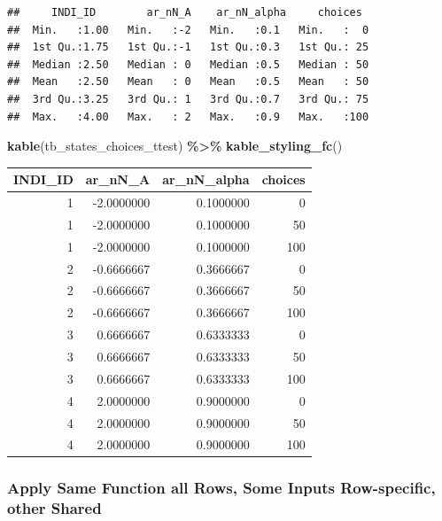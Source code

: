 \documentclass[
]{book}
\newenvironment{Shaded}{\begin{snugshade}}{\end{snugshade}}
\newcommand{\KeywordTok}[1]{\textcolor[rgb]{0.13,0.29,0.53}{\textbf{#1}}}
\newcommand{\NormalTok}[1]{#1}
\newcommand{\OperatorTok}[1]{\textcolor[rgb]{0.81,0.36,0.00}{\textbf{#1}}}
\newcommand{\StringTok}[1]{\textcolor[rgb]{0.31,0.60,0.02}{#1}}
\begin{document}
\begin{verbatim}
##     INDI_ID        ar_nN_A    ar_nN_alpha     choices   
##  Min.   :1.00   Min.   :-2   Min.   :0.1   Min.   :  0  
##  1st Qu.:1.75   1st Qu.:-1   1st Qu.:0.3   1st Qu.: 25  
##  Median :2.50   Median : 0   Median :0.5   Median : 50  
##  Mean   :2.50   Mean   : 0   Mean   :0.5   Mean   : 50  
##  3rd Qu.:3.25   3rd Qu.: 1   3rd Qu.:0.7   3rd Qu.: 75  
##  Max.   :4.00   Max.   : 2   Max.   :0.9   Max.   :100
\end{verbatim}

\begin{Shaded}
\begin{Highlighting}[]
\KeywordTok{kable}\NormalTok{(tb\_states\_choices\_ttest) }\OperatorTok{\%\textgreater{}\%}
\StringTok{  }\KeywordTok{kable\_styling\_fc}\NormalTok{()}
\end{Highlighting}
\end{Shaded}

\begin{table}[!h]
\centering
\begin{tabular}{r|r|r|r}
\hline
INDI\_ID & ar\_nN\_A & ar\_nN\_alpha & choices\\
\hline
\rowcolor{gray!6}  1 & -2.0000000 & 0.1000000 & 0\\
\hline
1 & -2.0000000 & 0.1000000 & 50\\
\hline
\rowcolor{gray!6}  1 & -2.0000000 & 0.1000000 & 100\\
\hline
2 & -0.6666667 & 0.3666667 & 0\\
\hline
\rowcolor{gray!6}  2 & -0.6666667 & 0.3666667 & 50\\
\hline
2 & -0.6666667 & 0.3666667 & 100\\
\hline
\rowcolor{gray!6}  3 & 0.6666667 & 0.6333333 & 0\\
\hline
3 & 0.6666667 & 0.6333333 & 50\\
\hline
\rowcolor{gray!6}  3 & 0.6666667 & 0.6333333 & 100\\
\hline
4 & 2.0000000 & 0.9000000 & 0\\
\hline
\rowcolor{gray!6}  4 & 2.0000000 & 0.9000000 & 50\\
\hline
4 & 2.0000000 & 0.9000000 & 100\\
\hline
\end{tabular}
\end{table}

\hypertarget{apply-same-function-all-rows-some-inputs-row-specific-other-shared}{%
\subsubsection{Apply Same Function all Rows, Some Inputs Row-specific, other Shared}\label{apply-same-function-all-rows-some-inputs-row-specific-other-shared}}
\end{document}
